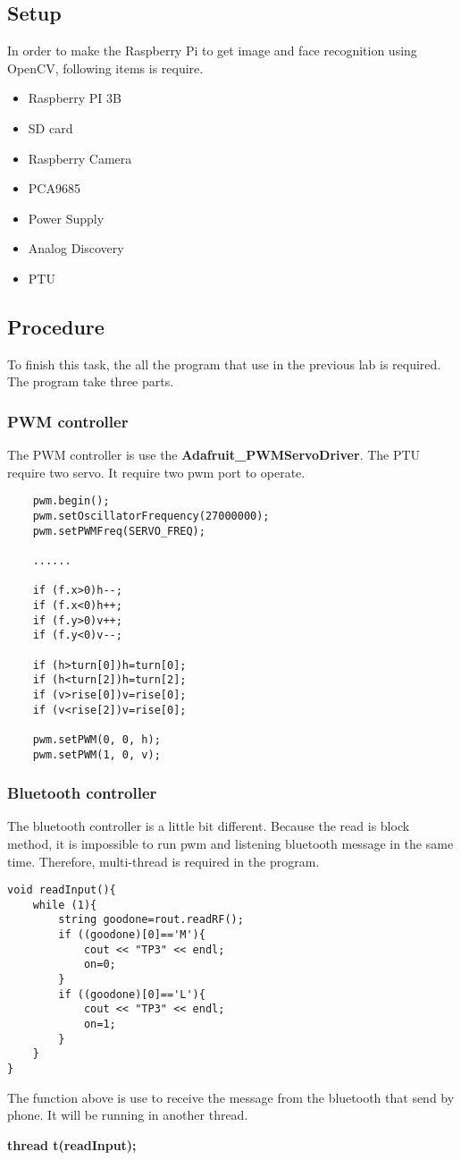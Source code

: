 \documentclass{article}
\begin{document}
\subsection{Setup}
In order to make the Raspberry Pi to get image and face recognition using OpenCV, following items is require.
\begin{itemize}
	\item Raspberry PI 3B
	\item SD card
	\item Raspberry Camera
	\item PCA9685
	\item Power Supply
	\item Analog Discovery
	\item PTU
\end{itemize}
\subsection{Procedure}
	To finish this task, the all the program that use in the previous lab is required. The program take three parts.
	\subsubsection{PWM controller}
		The PWM controller is use the \textbf{Adafruit\_PWMServoDriver}. The PTU require two servo. It require two pwm port to operate.  
		\begin{lstlisting}
	pwm.begin();
	pwm.setOscillatorFrequency(27000000);
	pwm.setPWMFreq(SERVO_FREQ);
	
	......
		
	if (f.x>0)h--;
	if (f.x<0)h++;
	if (f.y>0)v++;
	if (f.y<0)v--;
				
	if (h>turn[0])h=turn[0];
	if (h<turn[2])h=turn[2];
	if (v>rise[0])v=rise[0];
	if (v<rise[2])v=rise[0];
				
	pwm.setPWM(0, 0, h);
	pwm.setPWM(1, 0, v);
		\end{lstlisting}
	\subsubsection{Bluetooth controller}
		The bluetooth controller is a little bit different. Because the read is block method, it is impossible to run pwm and listening bluetooth message in the same time. Therefore, multi-thread is required in the program.
		\begin{lstlisting}
void readInput(){
	while (1){
		string goodone=rout.readRF();
		if ((goodone)[0]=='M'){
			cout << "TP3" << endl;
			on=0;
		}
		if ((goodone)[0]=='L'){
			cout << "TP3" << endl;
			on=1;
		}
	}
}
		\end{lstlisting}
		The function above is use to receive the message from the bluetooth that send by phone. It will be running in another thread.
		\begin{center}
		\textbf{thread t(readInput);}
		\end{center}
\end{document}
